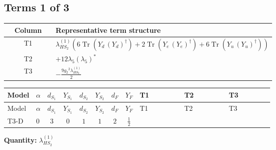 \documentclass[8pt]{article}
\begin{document}
\begin{landscape}
\subsection*{Terms 1 of 3}
\begin{center}
\begin{tabular}{@{}c >{\raggedright\arraybackslash}p{0.82\linewidth}@{}}
\toprule
Column & Representative term structure \\
\midrule
T1 & \(\displaystyle {\lambda_{HS_2}^{(1)}} (6 \operatorname{Tr}\!\left({Y_d}\,\left({Y_d}\right)^{\dagger}\right)+2 \operatorname{Tr}\!\left({Y_e}\,\left({Y_e}\right)^{\dagger}\right)+6 \operatorname{Tr}\!\left({Y_u}\,\left({Y_u}\right)^{\dagger}\right))\) \\
\midrule
T2 & \(\displaystyle +12 {\lambda_5} \left({\lambda_5}\right)^{*}\) \\
\midrule
T3 & \(\displaystyle -\frac{9 {g_2}^2 {\lambda_{HS_2}^{(1)}}}{2}\) \\
\midrule
\bottomrule
\end{tabular}
\end{center}
\smallskip
\tiny
\begin{longtable}{@{}llcccccc >{\raggedright\arraybackslash}p{0.21\linewidth} >{\raggedright\arraybackslash}p{0.21\linewidth} >{\raggedright\arraybackslash}p{0.21\linewidth}@{}}
\toprule
Model & $\alpha$ & $d_{S_1}$ & $Y_{S_1}$ & $d_{S_2}$ & $Y_{S_2}$ & $d_F$ & $Y_F$ & T1 & T2 & T3 \\
\midrule
\endfirsthead
\toprule
Model & $\alpha$ & $d_{S_1}$ & $Y_{S_1}$ & $d_{S_2}$ & $Y_{S_2}$ & $d_F$ & $Y_F$ & T1 & T2 & T3 \\
\midrule
\endhead
T3-D & $0$ & $3$ & $0$ & $1$ & $1$ & $2$ & $\frac{1}{2}$ & \scriptsize\adjustbox{max width=\linewidth}{$\begin{gathered} {\lambda_{HS_2}^{(1)}} (6 \operatorname{Tr}\!\left({Y_d}\,\left({Y_d}\right)^{\dagger}\right)+2 \operatorname{Tr}\!\left({Y_e}\,\left({Y_e}\right)^{\dagger}\right)+6 \operatorname{Tr}\!\left({Y_u}\,\left({Y_u}\right)^{\dagger}\right))\end{gathered}$} & \scriptsize\adjustbox{max width=\linewidth}{$\begin{gathered} +12 {\lambda_5} \left({\lambda_5}\right)^{*}\end{gathered}$} & \scriptsize\adjustbox{max width=\linewidth}{$\begin{gathered} -\frac{9 {g_2}^2 {\lambda_{HS_2}^{(1)}}}{2}\end{gathered}$} \\
\midrule
\bottomrule
\end{longtable}
\clearpage
\noindent\textbf{Quantity: }$\lambda_{HS_2}^{(1)}$\par\smallskip

\end{landscape}
\end{document}
